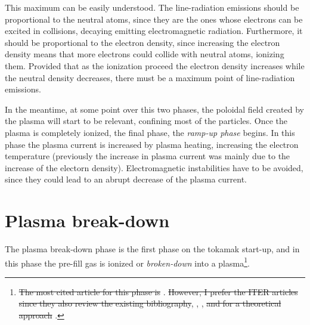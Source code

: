 \documentclass[a4paper,12pt,oneside]{book}
\begin{document}
This maximum can be easily understood. The line-radiation emissions should be proportional to the neutral atoms, since they are the ones whose electrons can be excited in collisions, decaying emitting electromagnetic radiation. Furthermore, it should be proportional to the electron density, since increasing the electron density means that more electrons could collide with neutral atoms, ionizing them. Provided that as the ionization proceed the electron density increases while the neutral density decreases, there must be a maximum point of line-radiation emissions.

In the meantime, at some point over this two phases, the poloidal field created by the plasma will start to be relevant, confining most of the particles. Once the plasma is completely ionized, the final phase, the \textit{ramp-up phase} begins. In this phase the plasma current is increased by plasma heating, increasing the electron temperature (previously the increase in plasma current was mainly due to the increase of the electorn density). Electromagnetic instabilities have to be avoided, since they could lead to an abrupt decrease of the plasma current.
%
%
\section{Plasma break-down}
\label{sec_breakdown}
The plasma break-down phase\cite{Lloyd_1991, ITER_1999, ITER_2007, ITER_2019} is the first phase on the tokamak start-up, and in this phase the pre-fill gas is ionized or \textit{broken-down} into a plasma\footnote{\st{The most cited article for this phase is} \cite{Lloyd_1991}. \st{However, I prefer the ITER articles since they also review the existing bibliography}, \cite{ITER_1999}, \cite{ITER_2007}, \st{and for a theoretical approach} \cite{ITER_2019}.}.
\end{document}
